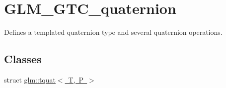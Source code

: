 \hypertarget{group__gtc__quaternion}{}\section{G\+L\+M\+\_\+\+G\+T\+C\+\_\+quaternion}
\label{group__gtc__quaternion}


Defines a templated quaternion type and several quaternion operations.  


\subsection*{Classes}
\begin{DoxyCompactItemize}
\item 
struct \mbox{\hyperlink{structglm_1_1tquat}{glm\+::tquat$<$ T, P $>$}}
\end{DoxyCompactItemize}
